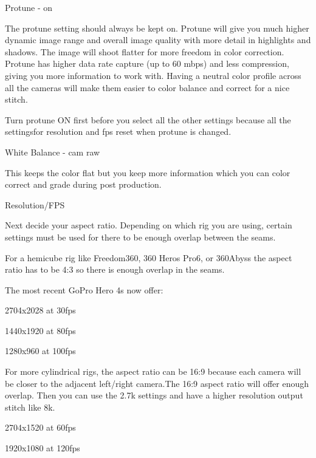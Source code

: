 \begin{fullwidth}
{\large Protune - on \par}


The protune setting should always be kept on. Protune will give you much higher dynamic image range and overall image quality with more detail in highlights and shadows. The image will shoot flatter for more freedom in color correction.  Protune has higher data rate capture (up to 60 mbps) and less compression, giving you more information to work with. Having a neutral color profile across all the cameras will make them easier to color balance and correct for a nice stitch. 

\tip Turn protune ON first before you select all the other settings because all the settingsfor resolution and fps reset when protune is changed.

\clearpage
{\large White Balance - cam raw \par} 


This keeps the color flat but you keep more information which you can color correct and grade during post production.

{\large Resolution/FPS \par}

Next decide your aspect ratio. Depending on which rig you are using, certain settings must be used for there to be enough overlap between the seams. 

For a hemicube rig like Freedom360, 360 Heros Pro6, or 360Abyss the aspect ratio has to be 4:3 so there is enough overlap in the seams. 

The most recent GoPro Hero 4s now offer:

2704x2028 at 30fps

1440x1920 at 80fps 

\clearpage
1280x960 at 100fps 


For more cylindrical rigs, the aspect ratio can be 16:9 because each camera will be closer to the adjacent left/right camera.The 16:9 aspect ratio will offer enough overlap. Then you can use the 2.7k settings and have a higher resolution output stitch like 8k. 

2704x1520 at 60fps


\clearpage
1920x1080 at 120fps



\end{fullwidth}
